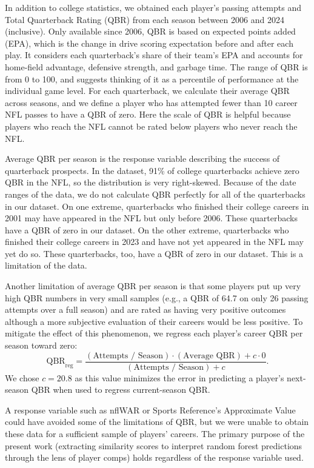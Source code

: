 \documentclass[Review, sageh, times]{sagej}
\begin{document}
In addition to college statistics, we obtained each player's passing attempts and Total Quarterback Rating (QBR) \citep{burke_how_2016} from each season between 2006 and 2024 (inclusive). Only available since 2006, QBR is based on expected points added (EPA), which is the change in drive scoring expectation before and after each play. It considers each quarterback's share of their team's EPA and accounts for home-field advantage, defensive strength, and garbage time. The range of QBR is from 0 to 100, and \citet{burke_how_2016} suggests thinking of it as a percentile of performance at the individual game level. For each quarterback, we calculate their average QBR across seasons, and we define a player who has attempted fewer than 10 career NFL passes to have a QBR of zero. Here the scale of QBR is helpful because players who reach the NFL cannot be rated below players who never reach the NFL. 

Average QBR per season is the response variable describing the success of quarterback prospects. In the dataset, 91\% of college quarterbacks achieve zero QBR in the NFL, so the distribution is very right-skewed. Because of the date ranges of the data, we do not calculate QBR perfectly for all of the quarterbacks in our dataset. On one extreme, quarterbacks who finished their college careers in 2001 may have appeared in the NFL but only before 2006. These quarterbacks have a QBR of zero in our dataset. On the other extreme, quarterbacks who finished their college careers in 2023 and have not yet appeared in the NFL may yet do so. These quarterbacks, too, have a QBR of zero in our dataset. This is a limitation of the data.

Another limitation of average QBR per season is that some players put up very high QBR numbers in very small samples (e.g., a QBR of 64.7 on only 26 passing attempts over a full season) and are rated as having very positive outcomes although a more subjective evaluation of their careers would be less positive. To mitigate the effect of this phenomenon, we regress each player's career QBR per season toward zero:
\begin{equation*}
  \mbox{QBR}_{\mbox{reg}} = \frac{(\mbox{Attempts / Season}) \cdot (\mbox{Average QBR}) + c \cdot 0}{(\mbox{Attempts / Season}) + c}.
\end{equation*}
We chose $c = 20.8$ as this value minimizes the error in predicting a player's next-season QBR when used to regress current-season QBR.

A response variable such as nflWAR \citep{yurko_nflwar_2019} or Sports Reference's Approximate Value could have avoided some of the limitations of QBR, but we were unable to obtain these data for a sufficient sample of players' careers. The primary purpose of the present work (extracting similarity scores to interpret random forest predictions through the lens of player comps) holds regardless of the response variable used.
\end{document}
